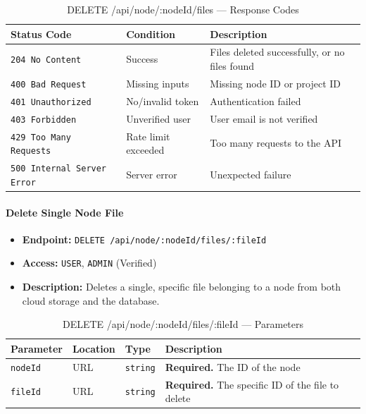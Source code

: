 \begin{table}[H]
\centering
\renewcommand{\arraystretch}{1.3}
\begin{tabularx}{\textwidth}{|l|l|X|}
\hline
\textbf{Status Code} & \textbf{Condition} & \textbf{Description} \\
\hline
\texttt{204 No Content}   & Success          & Files deleted successfully, or no files found \\
\hline
\texttt{400 Bad Request}  & Missing inputs   & Missing node ID or project ID \\
\hline
\texttt{401 Unauthorized} & No/invalid token & Authentication failed \\
\hline
\texttt{403 Forbidden}    & Unverified user  & User email is not verified \\
\hline
\texttt{429 Too Many Requests} & Rate limit exceeded & Too many requests to the API \\
\hline
\texttt{500 Internal Server Error} & Server error & Unexpected failure \\
\hline
\end{tabularx}
\caption{DELETE /api/node/:nodeId/files — Response Codes}
\label{tab:delete-node-files-responses}
\end{table}
\FloatBarrier

\paragraph{Delete Single Node File}
\label{subsubsec:delete-single-node-file}

\begin{itemize}
  \item \textbf{Endpoint:} \texttt{DELETE /api/node/:nodeId/files/:fileId}
  \item \textbf{Access:} \texttt{USER}, \texttt{ADMIN} (Verified)
  \item \textbf{Description:} Deletes a single, specific file belonging to a node from both cloud storage and the database.
\end{itemize}

\begin{table}[H]
\centering
\renewcommand{\arraystretch}{1.3}
\begin{tabularx}{\textwidth}{|l|l|l|X|}
\hline
\textbf{Parameter} & \textbf{Location} & \textbf{Type} & \textbf{Description} \\
\hline
\texttt{nodeId}  & URL & \texttt{string}  & \textbf{Required.} The ID of the node \\
\hline
\texttt{fileId}  & URL & \texttt{string}  & \textbf{Required.} The specific ID of the file to delete \\
\hline
\end{tabularx}
\caption{DELETE /api/node/:nodeId/files/:fileId — Parameters}
\label{tab:delete-single-node-file-params}
\end{table}

